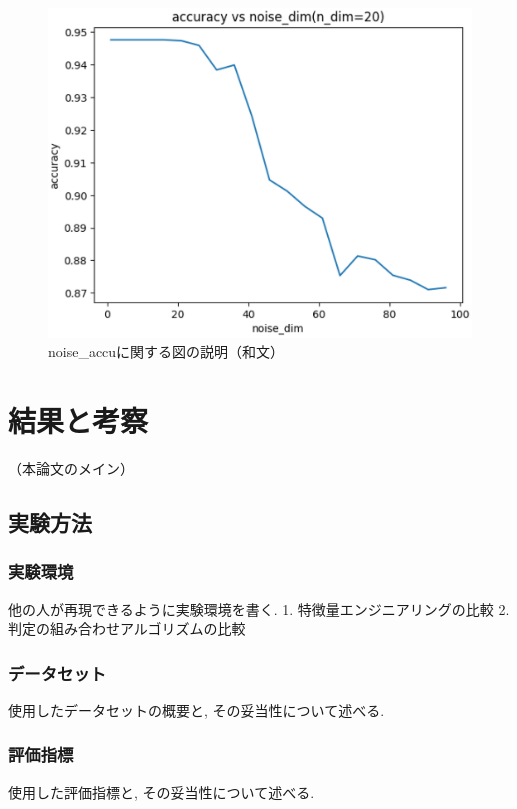 \documentclass{css}
\begin{document}
\begin{figure}[tb]
    \centering
    \includegraphics[width=\linewidth]{pictures/eps/noise_accu.eps}
    \caption{noise\_accuに関する図の説明（和文）}
    \label{fig:noise_accu}
\end{figure}

\section{結果と考察}
（本論文のメイン）

\subsection{実験方法}

\subsubsection{実験環境}
他の人が再現できるように実験環境を書く.
1. 特徴量エンジニアリングの比較
2. 判定の組み合わせアルゴリズムの比較

\subsubsection{データセット}
使用したデータセットの概要と, その妥当性について述べる.

\subsubsection{評価指標}
使用した評価指標と, その妥当性について述べる.
\end{document}
